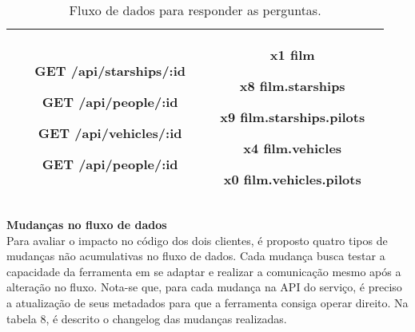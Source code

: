 \begin{table}[H]
\begin{tabular}{|c|c|c|}
\begin{minipage}[t]{0.3\textwidth}
\begin{itemize}
        \item[\textbf{GET}] /api/starships/:id
        \item[\textbf{GET}] /api/people/:id
        \item[\textbf{GET}] /api/vehicles/:id
        \item[\textbf{GET}] /api/people/:id
      \end{itemize}
    \end{minipage} & \begin{minipage}[t]{0.5\textwidth}
      \begin{itemize}
        \item[\textbf{x1}] film
        \item[\textbf{x8}] film.starships
        \item[\textbf{x9}] film.starships.pilots
        \item[\textbf{x4}] film.vehicles
        \item[\textbf{x0}] film.vehicles.pilots
      \end{itemize}
    \end{minipage} \\
    \hline
  \end{tabular}
  \caption{Fluxo de dados para responder as perguntas.}
\end{table}

\textbf{Mudanças no fluxo de dados} \\

Para avaliar o impacto no código dos dois clientes, é proposto quatro tipos de mudanças não acumulativas no fluxo de dados. Cada mudança busca testar a capacidade da ferramenta em se adaptar e realizar a comunicação mesmo após a alteração no fluxo. Nota-se que, para cada mudança na API do serviço, é preciso a atualização de seus metadados para que a ferramenta consiga operar direito. Na tabela 8, é descrito o changelog das mudanças realizadas.

